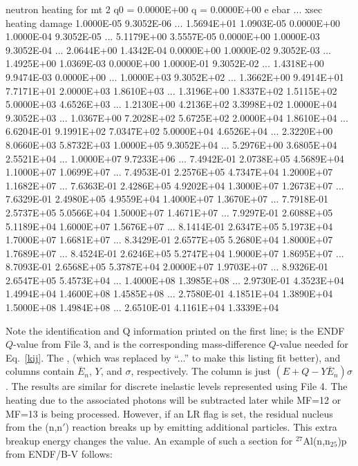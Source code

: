 \small
\begin{ccode}

 neutron heating for mt  2   q0 =  0.0000E+00     q =  0.0000E+00
            e          ebar   ...       xsec       heating        damage
   1.0000E-05    9.3052E-06   ... 1.5694E+01    1.0903E-05    0.0000E+00
   1.0000E-04    9.3052E-05   ... 5.1179E+00    3.5557E-05    0.0000E+00
   1.0000E-03    9.3052E-04   ... 2.0644E+00    1.4342E-04    0.0000E+00
   1.0000E-02    9.3052E-03   ... 1.4925E+00    1.0369E-03    0.0000E+00
   1.0000E-01    9.3052E-02   ... 1.4318E+00    9.9474E-03    0.0000E+00
     ...
   1.0000E+03    9.3052E+02   ... 1.3662E+00    9.4914E+01    7.7171E+01
   2.0000E+03    1.8610E+03   ... 1.3196E+00    1.8337E+02    1.5115E+02
   5.0000E+03    4.6526E+03   ... 1.2130E+00    4.2136E+02    3.3998E+02
   1.0000E+04    9.3052E+03   ... 1.0367E+00    7.2028E+02    5.6725E+02
   2.0000E+04    1.8610E+04   ... 6.6204E-01    9.1991E+02    7.0347E+02
   5.0000E+04    4.6526E+04   ... 2.3220E+00    8.0660E+03    5.8732E+03
   1.0000E+05    9.3052E+04   ... 5.2976E+00    3.6805E+04    2.5521E+04
     ...
   1.0000E+07    9.7233E+06   ... 7.4942E-01    2.0738E+05    4.5689E+04
   1.1000E+07    1.0699E+07   ... 7.4953E-01    2.2576E+05    4.7347E+04
   1.2000E+07    1.1682E+07   ... 7.6363E-01    2.4286E+05    4.9202E+04
   1.3000E+07    1.2673E+07   ... 7.6329E-01    2.4980E+05    4.9559E+04
   1.4000E+07    1.3670E+07   ... 7.7918E-01    2.5737E+05    5.0566E+04
   1.5000E+07    1.4671E+07   ... 7.9297E-01    2.6088E+05    5.1189E+04
   1.6000E+07    1.5676E+07   ... 8.1414E-01    2.6347E+05    5.1973E+04
   1.7000E+07    1.6681E+07   ... 8.3429E-01    2.6577E+05    5.2680E+04
   1.8000E+07    1.7689E+07   ... 8.4524E-01    2.6246E+05    5.2747E+04
   1.9000E+07    1.8695E+07   ... 8.7093E-01    2.6568E+05    5.3787E+04
   2.0000E+07    1.9703E+07   ... 8.9326E-01    2.6547E+05    5.4573E+04
     ...
   1.4000E+08    1.3985E+08   ... 2.9730E-01    4.3523E+04    1.4994E+04
   1.4600E+08    1.4585E+08   ... 2.7580E-01    4.1851E+04    1.3890E+04
   1.5000E+08    1.4984E+08   ... 2.6510E-01    4.1161E+04    1.3339E+04

\end{ccode}
\normalsize

\noindent
Note the identification and Q information printed on the first
line;  is the ENDF $Q$-value from File 3, and  is
the corresponding mass-difference $Q$-value needed for Eq.~\ref{kij}.
The ,  (which was replaced by ``...''
to make this listing fit better), and  columns contain
$\overline{E}_n$, $Y$, and $\sigma$, respectively.   The
 column is just $(E{+}Q{-}Y\overline{E}_n)\sigma$.
The results are similar for discrete inelastic levels represented
using File 4.  The heating due to the associated photons will be
subtracted later while MF=12 or MF=13 is being processed.  However,
if an LR flag is set, the residual nucleus from the (n,n$'$)
reaction breaks up by emitting additional particles.  This extra
breakup energy changes the  value.  An example of such
a section for $^{27}$Al(n,n$_{25}$)p from ENDF/B-V follows:

